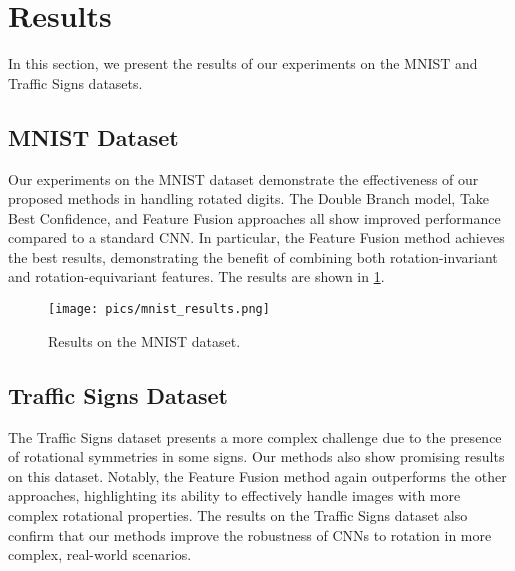\section{Results}
\label{sec:results}

In this section, we present the results of our experiments on the MNIST and Traffic Signs datasets.

\subsection{MNIST Dataset}
Our experiments on the MNIST dataset demonstrate the effectiveness of our proposed methods in handling rotated digits. 
The Double Branch model, Take Best Confidence, and Feature Fusion approaches all show improved performance compared to a standard CNN. 
In particular, the Feature Fusion method achieves the best results, demonstrating the benefit of combining both rotation-invariant and rotation-equivariant features.
The results are shown in \cref{fig:mnist_results}.

\begin{figure}
    \centering
    \texttt{[image: pics/mnist\_results.png]}
    \caption{Results on the MNIST dataset.}
    \label{fig:mnist_results}
\end{figure}


\subsection{Traffic Signs Dataset}
The Traffic Signs dataset presents a more complex challenge due to the presence of rotational symmetries in some signs. Our methods also show promising results on this dataset. Notably, the Feature Fusion method again outperforms the other approaches, highlighting its ability to effectively handle images with more complex rotational properties. The results on the Traffic Signs dataset also confirm that our methods improve the robustness of CNNs to rotation in more complex, real-world scenarios.
